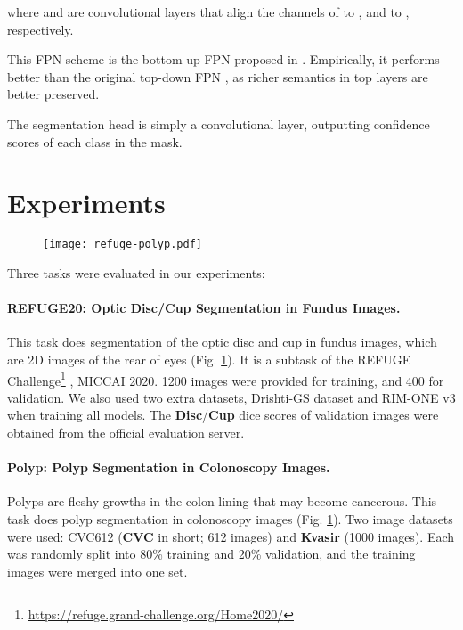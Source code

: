 \documentclass{article}
\begin{document}
where  and  are  convolutional layers that align the channels of  to , and  to , respectively.

This FPN scheme is the bottom-up FPN proposed in \cite{panet}. Empirically, it performs better than the original top-down FPN \cite{fpn}, as richer semantics in top layers are better preserved.

The segmentation head is simply a  convolutional layer, outputting confidence scores of each class in the mask.

\section{Experiments}
\begin{figure}
\centering
  \texttt{[image: refuge-polyp.pdf]}
  \label{fig:refuge-polyp}
\end{figure}
Three tasks were evaluated in our experiments:

\paragraph{REFUGE20: Optic Disc/Cup Segmentation in Fundus Images.}
This task does segmentation of the optic disc and cup in fundus images, which are 2D images of the rear of eyes (Fig. \ref{fig:refuge-polyp}). It is a subtask of the REFUGE  Challenge\footnote{\url{https://refuge.grand-challenge.org/Home2020/}} \cite{refuge}, MICCAI 2020. 1200 images were provided for training, and 400 for validation. We also used two extra datasets, Drishti-GS dataset \cite{drishti} and RIM-ONE v3 \cite{rim-one} when training all models. The \textbf{Disc}/\textbf{Cup} dice scores of validation images were obtained from the official evaluation server.

\paragraph{Polyp: Polyp Segmentation in Colonoscopy Images.}
Polyps are fleshy growths in the colon lining that may become cancerous. This task does polyp segmentation in colonoscopy images (Fig. \ref{fig:refuge-polyp}). Two image datasets \cite{pranet} were used: CVC612 (\textbf{CVC} in short; 612 images) and \textbf{Kvasir} (1000 images). Each was randomly split into 80\% training and 20\% validation, and the training images were merged into one set.
\end{document}

